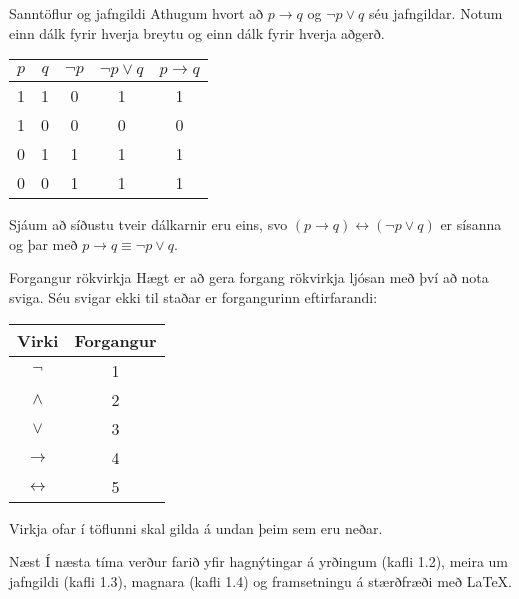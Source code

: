 \documentclass[handout]{beamer}
\begin{document}
\begin{frame}{Sanntöflur og jafngildi}
Athugum hvort að $p \to q$ og $\lnot p \lor q$ séu jafngildar. Notum einn dálk fyrir hverja breytu og einn dálk fyrir hverja aðgerð. \pause
\begin{center}
\begin{tabular}{ccccc}
\toprule
$p$&$q$&$\lnot p$&$\lnot p \lor q$&$p \to q$ \\
\midrule
1&1&0&1&1\\
1&0&0&0&0\\
0&1&1&1&1\\
0&0&1&1&1\\
\bottomrule
\end{tabular}
\end{center}
Sjáum að síðustu tveir dálkarnir eru eins, svo $(p \to q) \leftrightarrow (\lnot p \lor q)$ er sísanna og þar með $p \to q \equiv \lnot p \lor q$.
\end{frame}

\begin{frame}{Forgangur rökvirkja}
Hægt er að gera forgang rökvirkja ljósan með því að nota sviga. Séu svigar ekki til staðar er forgangurinn eftirfarandi:

\begin{center}
\begin{tabular}{cc}
\toprule
Virki&Forgangur\\
\midrule
$\lnot$&1\\
$\land$&2\\
$\lor$&3\\
$\to$&4\\
$\leftrightarrow$&5\\
\bottomrule
\end{tabular}
\end{center}

Virkja ofar í töflunni skal gilda á undan þeim sem eru neðar.
\end{frame}

\begin{frame}{Næst}
Í næsta tíma verður farið yfir hagnýtingar á yrðingum (kafli 1.2), meira um jafngildi (kafli 1.3), magnara (kafli 1.4) og framsetningu á stærðfræði með \LaTeX.
\end{frame}
\end{document}
